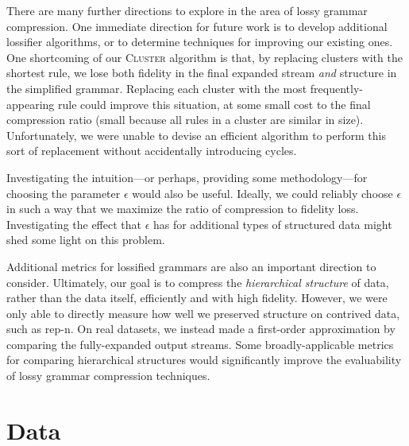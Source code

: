 \documentclass[11pt]{article}
\newcommand{\Cluster}{\textsc{Cluster}\xspace}
\begin{document}
There are many further directions to explore in the area of lossy grammar
compression.  One immediate direction for future work is to develop additional
lossifier algorithms, or to determine techniques for improving our existing
ones.  One shortcoming of our \Cluster algorithm is that, by replacing clusters
with the shortest rule, we lose both fidelity in the final expanded stream
\emph{and} structure in the simplified grammar.  Replacing each cluster with
the most frequently-appearing rule could improve this situation, at some small
cost to the final compression ratio (small because all rules in a cluster are
similar in size).  Unfortunately, we were unable to devise an efficient
algorithm to perform this sort of replacement without accidentally introducing
cycles.

Investigating the intuition---or perhaps, providing some methodology---for
choosing the parameter $\epsilon$ would also be useful.  Ideally, we could
reliably choose $\epsilon$ in such a way that we maximize the ratio of
compression to fidelity loss.  Investigating the effect that $\epsilon$ has for
additional types of structured data might shed some light on this problem.

Additional metrics for lossified grammars are also an important direction to
consider.  Ultimately, our goal is to compress the \emph{hierarchical
structure} of data, rather than the data itself, efficiently and with high
fidelity.  However, we were only able to directly measure how well we preserved
structure on contrived data, such as rep-n.  On real datasets, we instead made
a first-order approximation by comparing the fully-expanded output streams.
Some broadly-applicable metrics for comparing hierarchical structures would
significantly improve the evaluability of lossy grammar compression techniques.

\pagebreak

\nocite{*}



\pagebreak

\appendix

\section{Data}
\end{document}
